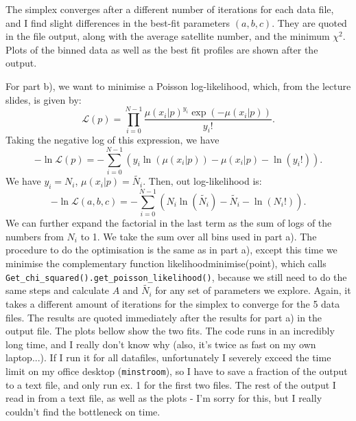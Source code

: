 \documentclass{article}
\begin{document}
The simplex converges after a different number of iterations for each data file, and I find slight differences in the best-fit parameters $(a, b, c)$. They are quoted in the file output, along with the average satellite number, and the minimum $\chi^2$. Plots of the binned data as well as the best fit profiles are shown after the output.

For part b), we want to minimise a Poisson log-likelihood, which, from the lecture slides, is given by:
\begin{equation}
    \mathcal{L}(p) = \prod_{i=0}^{N-1} \frac{\mu(x_i|p)^{y_i}\exp(-\mu(x_i|p))}{y_i!}.
\end{equation}
Taking the negative log of this expression, we have
\begin{equation}
    - \ln \mathcal{L}(p) = - \sum_{i=0}^{N-1}(y_i \ln(\mu(x_i|p)) - \mu(x_i|p) - \ln (y_i!)).
\end{equation}
We have $y_i = N_i$, $\mu(x_i|p) = \tilde{N_i}$. Then, out log-likelihood is:
\begin{equation}
    - \ln \mathcal{L}(a, b, c) = - \sum_{i=0}^{N-1}(N_i \ln(\tilde{N_i}) - \tilde{N_i} - \ln (N_i!)).
\end{equation}
We can further expand the factorial in the last term as the sum of logs of the numbers from $N_i$ to 1. We take the sum over all bins used in part a). The procedure to do the optimisation is the same as in part a), except this time we minimise the complementary function likelihood\textunderscore minimise(point), which calls \verb+Get_chi_squared().get_poisson_likelihood()+, because we still need to do the same steps and calculate $A$ and $\tilde{N_i}$ for any set of parameters we explore. Again, it takes a  different amount of iterations for the simplex to converge for the 5 data files. The results are quoted immediately after the results for part a) in the output file. The plots bellow show the two fits. The code runs in an incredibly long time, and I really don't know why (also, it's twice as fast on my own laptop...). If I run it for all datafiles, unfortunately I severely exceed the time limit on my office desktop (\verb+minstroom+), so I have to save a fraction of the output to a text file, and only run ex. 1 for the first two files. The rest of the output I read in from a text file, as well as the plots - I'm sorry for this, but I really couldn't find the bottleneck on time.
\end{document}
